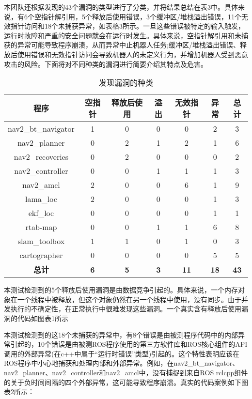 本团队还根据发现的43个漏洞的类型进行了分类，并将结果总结在表3中。具体来说，有6个空指针解引用，5个释放后使用错误，3个缓冲区/堆栈溢出错误，11个无效指针访问和18个未捕获异常，如表格3所示。一旦这些错误被特定的输入触发，运行时故障和严重的安全问题就会在运行时发生。具体来说，空指针解引用和未捕获的异常可能导致程序崩溃，从而异常中止机器人任务;缓冲区/堆栈溢出错误、释放后使用错误和无效指针访问会导致机器人的未定义行为，并增加机器人受到恶意攻击的风险。下面将对不同种类的漏洞进行简要介绍其特点及危害。
\begin{table}[H]
	\small
	\caption{发现漏洞的种类}
	\centering
	\begin{tabular}{ccccccc}
		\hline
		\textbf{程序} & \textbf{空指针} & \textbf{释放后使用} & \textbf{溢出} & \textbf{无效指针} & \textbf{异常} & \textbf{总计} \\
		\hline
		nav2\_bt\_navigator & 1 & 0 & 0 & 0 & 2 & 3 \\
		nav2\_planner & 0 & 2 & 1 & 2 & 1 & 6 \\
		nav2\_recoveries & 0 & 2 & 0 & 0 & 0 & 2 \\
		nav2\_controller & 0 & 0 & 1 & 1 & 1 & 3 \\
		nav2\_amcl & 2 & 0 & 0 & 6 & 1 & 9 \\
		lama\_loc & 2 & 0 & 0 & 0 & 1 & 3 \\
		ekf\_loc & 0 & 0 & 0 & 0 & 1 & 1 \\
		rtab-map & 0 & 0 & 1 & 1 & 6 & 8 \\
		slam\_toolbox & 1 & 1 & 0 & 1 & 0 & 3 \\
		cartographer & 0 & 0 & 0 & 0 & 5 & 5 \\
		\textbf{总计} & \textbf{6} & \textbf{5} & \textbf{3} & \textbf{11} & \textbf{18} & \textbf{43} \\
		\hline
	\end{tabular}
\end{table}

本测试检测到的5个释放后使用漏洞是由数据竞争引起的。具体来说，一个内存对象在一个线程中被释放，但这个对象仍然在另一个线程中使用，没有同步。由于并发执行的不确定性，在正常执行中很难发现这些漏洞。一个真实含有释放后使用漏洞的代码如图表1所示

本测试检测到的这18个未捕获的异常中，有8个错误是由被测程序代码中的内部异常引起的，10个错误是由被测ROS程序使用的第三方软件库和ROS核心组件的API调用的外部异常(在c++中属于``运行时错误''类型)引起的。这个特性表明应该在ROS程序中小心地捕获和处理内部和外部异常。例如，在nav2\_bt\_navigator、nav2\_planner、nav2\_controller和nav2\_amcl中，没有捕捉到来自ROS
rclcpp组件的关于负时间间隔的四个外部异常，这可能导致程序崩溃。真实的代码案例如下图表2所示：

